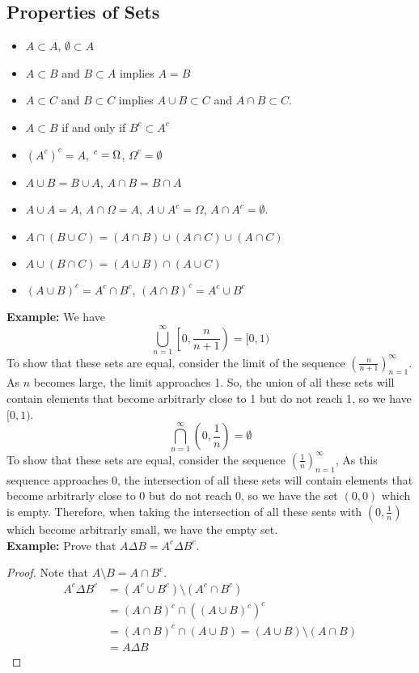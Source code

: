 \documentclass[openany]{report}
\begin{document}
\subsection{Properties of Sets}
\begin{itemize}
    \item $A \subset A$, $\emptyset \subset A$
    \item $A \subset B$ and $B \subset A$ implies $A = B$
    \item $A \subset C$ and $B \subset C$ implies $A \cup B \subset C$ and $A \cap B \subset C$. 
    \item $A \subset B$ if and only if $B^c \subset A^c$
    \item $(A^c)^c = A$, $\empty^c = \Omega$, $\Omega^c = \emptyset$
    \item $A \cup B = B \cup A$, $A \cap B = B \cap A$
    \item $A \cup A = A$, $A \cap \Omega = A$, $A \cup A^c = \Omega$, $A \cap A^c = \emptyset$. 
    \item $A \cap (B \cup C) = (A \cap B) \cup (A \cap C) \cup (A \cap C)$
    \item $A \cup (B \cap C) = (A \cup B) \cap (A \cup C)$
    \item $(A \cup B)^c = A^c \cap B^c$, $(A \cap B)^c = A^c \cup B^c$
\end{itemize}
\textbf{Example:} We have 
\[\bigcup_{n=1}^\infty \left[0, \frac{n}{n+1}\right) = [0,1)\]
To show that these sets are equal, consider the limit of the sequence $\left(\frac{n}{n+1}\right)_{n=1}^\infty$. As $n$ becomes large, the limit approaches 1. So, the union of all these sets will contain elements that become arbitrarly close to 1 but do not reach 1, so we have $[0,1)$.
\[\bigcap_{n=1}^\infty \left(0, \frac{1}{n}\right) = \emptyset\]
To show that these sets are equal, consider the sequence $\left(\frac{1}{n}\right)_{n=1}^\infty$, As this sequence approaches 0, the intersection of all these sets will contain elements that become arbitrarly close to 0 but do not reach 0, so we have the set $(0, 0)$ which is empty. Therefore, when taking the intersection of all these sents with $\left(0, \frac{1}{n}\right)$ which become arbitrarly small, we have the empty set.\\[2ex]
\noindent
\textbf{Example:} Prove that $A \Delta B = A^c \Delta B^c$.
\begin{proof}
    Note that $A \setminus B = A \cap B^c$. 
    \begin{align*}
        A^c \Delta B^c &= (A^c \cup B^c) \setminus (A^c \cap B^c)\\
        &= (A \cap B)^c \cap ((A \cup B)^c)^c\\ 
        &= (A \cap B)^c \cap (A \cup B) = (A \cup B) \setminus (A \cap B) \\
        &= A \Delta B  
    \end{align*}
\end{proof}
\end{document}
